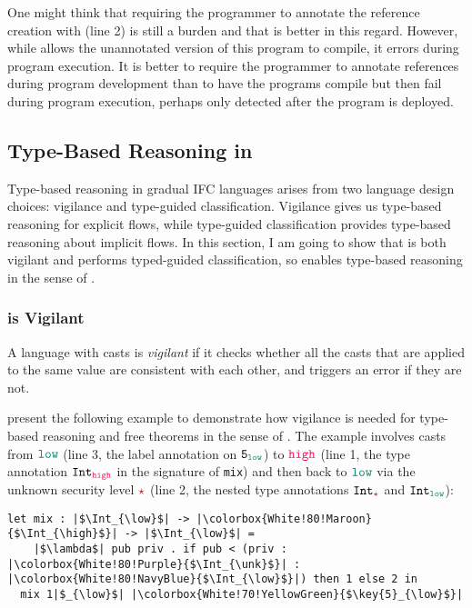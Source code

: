 One might think that requiring the programmer to annotate the reference creation
with \high (line 2) is still a burden and that \GSLRef is better in this regard.
However, while \GSLRef allows the unannotated version of this program to
compile, it errors during program execution. It is better to require the
programmer to annotate references during program development than to have the
programs compile but then fail during program execution, perhaps only detected
after the program is deployed.

\subsection{Type-Based Reasoning in \Surface}
\label{sec:example3}

Type-based reasoning in gradual IFC languages arises from two language design
choices: vigilance and type-guided classification. Vigilance gives us type-based
reasoning for explicit flows, while type-guided classification provides
type-based reasoning about implicit flows. In this section, I am going to show
that \Surface is both vigilant and performs typed-guided classification, so
\Surface enables type-based reasoning in the sense of \textcite{Toro:2018aa}.

\subsubsection{\Surface is Vigilant}

A language with casts is \textit{vigilant} if it checks whether all the casts
that are applied to the same value are consistent with each other, and triggers
an error if they are not.

\textcite{Toro:2018aa} present the following example to demonstrate how vigilance
is needed for type-based reasoning and free theorems in the sense of
\textcite{Wadler:1989fk}. The example involves casts from $\low$ (line 3, the label
annotation on $\key{5}_{\low}$) to $\high$ (line 1, the type annotation
$\Int_{\high}$ in the signature of \texttt{mix}) and then back to $\low$ via the
unknown security level $\unk$ (line 2, the nested type annotations $\Int_{\unk}$
and $\Int_{\low}$):

\begin{lstlisting}[style=tt]
  let mix : |$\Int_{\low}$| -> |\colorbox{White!80!Maroon}{$\Int_{\high}$}| -> |$\Int_{\low}$| =
    |$\lambda$| pub priv . if pub < (priv : |\colorbox{White!80!Purple}{$\Int_{\unk}$}| : |\colorbox{White!80!NavyBlue}{$\Int_{\low}$}|) then 1 else 2 in
  mix 1|$_{\low}$| |\colorbox{White!70!YellowGreen}{$\key{5}_{\low}$}|
\end{lstlisting}

